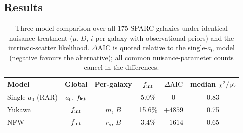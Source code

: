 \documentclass[11pt,a4paper]{article}
\begin{document}
\subsection{Results}

\begin{table}[t]
\centering
\begin{tabular}{lccccc}
\hline
Model & Global & Per-galaxy & $f_{\rm int}$ &
$\Delta\mathrm{AIC}$ & median $\chi^2/\mathrm{pt}$ \\
\hline
Single-$a_0$ (RAR) & $a_0$, $f_{\rm int}$ & --- & 5.0\% & $0$ & 0.83 \\
Yukawa & $f_{\rm int}$ & $m$, $B$ & 15.6\% & $+4859$ & 0.75 \\
NFW & $f_{\rm int}$ & $r_s$, $B$ & 3.4\% & $-1614$ & 0.65 \\
\hline
\end{tabular}
\caption{Three-model comparison over all 175 SPARC galaxies under
identical nuisance treatment ($\mu$, $D$, $i$ per galaxy with
observational priors) and the intrinsic-scatter likelihood.
$\Delta\mathrm{AIC}$ is quoted relative to the single-$a_0$ model
(negative favours the alternative); all common nuisance-parameter
counts cancel in the differences.}
\label{tab:refit}
\end{table}
\end{document}
